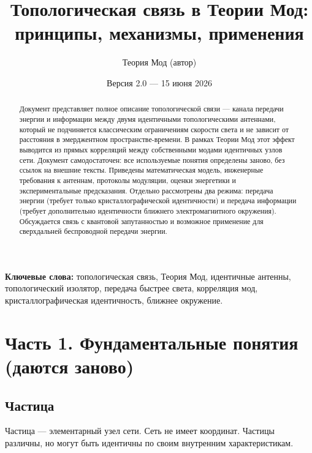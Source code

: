 \documentclass[a4paper,12pt]{article}
\title{Топологическая связь в Теории Мод:\\ принципы, механизмы, применения}
\author{Теория Мод (автор)}
\date{Версия 2.0 --- 15 июня 2026}
\begin{document}
\maketitle

\begin{abstract}
\noindent
Документ представляет полное описание топологической связи — канала передачи энергии и информации между двумя идентичными топологическими антеннами, который не подчиняется классическим ограничениям скорости света и не зависит от расстояния в эмерджентном пространстве-времени. В рамках Теории Мод этот эффект выводится из прямых корреляций между собственными модами идентичных узлов сети. Документ самодостаточен: все используемые понятия определены заново, без ссылок на внешние тексты. Приведены математическая модель, инженерные требования к антеннам, протоколы модуляции, оценки энергетики и экспериментальные предсказания. Отдельно рассмотрены два режима: передача энергии (требует только кристаллографической идентичности) и передача информации (требует дополнительно идентичности ближнего электромагнитного окружения). Обсуждается связь с квантовой запутанностью и возможное применение для сверхдальней беспроводной передачи энергии.
\end{abstract}

\noindent
\textbf{Ключевые слова:} топологическая связь, Теория Мод, идентичные антенны, топологический изолятор, передача быстрее света, корреляция мод, кристаллографическая идентичность, ближнее окружение.

\tableofcontents

\section*{Часть 1. Фундаментальные понятия (даются заново)}

\subsection{Частица}
Частица — элементарный узел сети. Сеть не имеет координат. Частицы различны, но могут быть идентичны по своим внутренним характеристикам.
\end{document}
